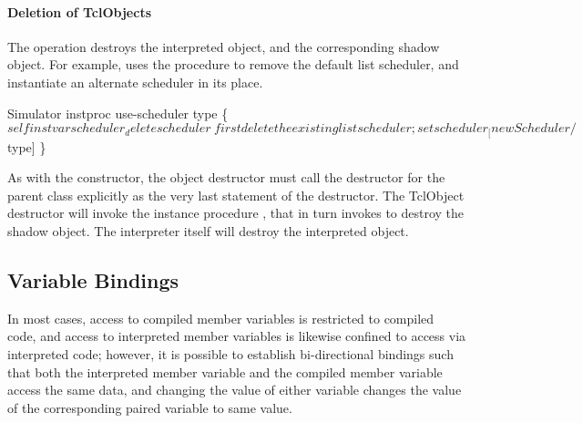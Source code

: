 \paragraph{Deletion of TclObjects}
The  operation
destroys the interpreted object, and the corresponding shadow object.
For example,
uses the  procedure to remove the default list scheduler,
and instantiate an alternate scheduler in its place.
\begin{program}
        Simulator instproc use-scheduler type \{
                $self instvar scheduler_

                delete scheduler_ \; first delete the existing list scheduler;
                set scheduler_ [new Scheduler/$type]
        \}
\end{program}

As with the constructor, the object destructor must call the destructor
for the parent class explicitly as the very last statement of the destructor.
The TclObject destructor
will invoke the instance procedure ,
that in turn invokes 
to destroy the shadow object.
The interpreter itself will destroy the interpreted object.

\subsection{Variable Bindings}
\label{sec:VarBinds}

In most cases,
access to compiled member variables is restricted to compiled code,
and access to interpreted member variables is likewise
confined to access via interpreted code;
however, it is possible to establish bi-directional bindings
such that both the interpreted member variable
and the compiled member variable access the same data, 
and changing the value of either variable
changes the value of the corresponding paired variable to same value.

